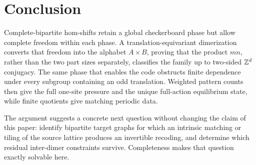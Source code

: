 \section{Conclusion}

Complete-bipartite hom-shifts retain a global checkerboard phase but allow
complete freedom within each phase.  A translation-equivariant dimerization
converts that freedom into the alphabet $A\times B$, proving that the product
$mn$, rather than the two part sizes separately, classifies the family up to
two-sided $\mathbb Z^d$ conjugacy.  The same phase that enables the code obstructs
finite dependence under every subgroup containing an odd translation.
Weighted pattern counts then give the full one-site pressure and the unique
full-action equilibrium state, while finite quotients give matching periodic
data.

The argument suggests a concrete next question without changing the claim of
this paper: identify bipartite target graphs for which an intrinsic matching
or tiling of the source lattice produces an invertible recoding, and determine
which residual inter-dimer constraints survive.  Completeness makes that
question exactly solvable here.
